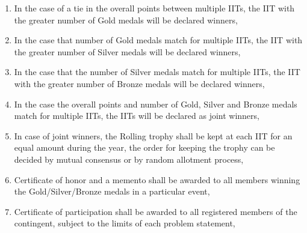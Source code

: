 \begin{enumerate}
    \item In the case of a tie in the overall points between multiple IITs, the IIT with the greater number of Gold medals will be declared winners,
    \item In the case that number of Gold medals match for multiple IITs, the IIT with the greater number of Silver medals will be declared winners,
    \item In the case that the number of Silver medals match for multiple IITs, the IIT with the greater number of Bronze medals will be declared winners,
    \item In the case the overall points and number of Gold, Silver and Bronze medals match for multiple IITs, the IITs will be declared as joint winners,
    \item In case of joint winners, the Rolling trophy shall be kept at each IIT for an equal amount during the year, the order for keeping the trophy can be decided by mutual consensus or by random allotment process,
    \item Certificate of honor and a memento shall be awarded to all members winning the Gold/Silver/Bronze medals in a particular event,
    \item Certificate of participation shall be awarded to all registered members of the contingent, subject to the limits of each problem statement,
\end{enumerate}
